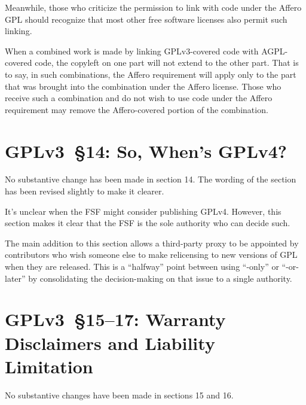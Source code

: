 Meanwhile, those who criticize the permission to link with code under the Affero
GPL should recognize that most other free software licenses also permit
such linking. 


When a combined work is made by linking GPLv3-covered code with AGPL-covered
code, the copyleft on one part will not extend to the other part. That is to
say, in such combinations, the Affero requirement will apply only to the part
that was brought into the combination under the Affero license. Those who
receive such a combination and do not wish to use code under the Affero
requirement may remove the Affero-covered portion of the combination.

\section{GPLv3~\S14: So, When's GPLv4?}
\label{GPLv3s14}

No substantive change has been made in section 14. The wording of the section
has been revised slightly to make it clearer.

It's unclear when the FSF might consider publishing GPLv4.  However, this
section makes it clear that the FSF is the sole authority who can decide
such.

The main addition to this section allows a third-party proxy to be appointed
by contributors who wish someone else to make relicensing to new versions of
GPL when they are released.  This is a ``halfway'' point between using ``-only''
or ``-or-later'' by consolidating the decision-making on that issue to a
single authority.


\section{GPLv3~\S15--17: Warranty Disclaimers and Liability Limitation}

No substantive changes have been made in sections 15 and 16.




